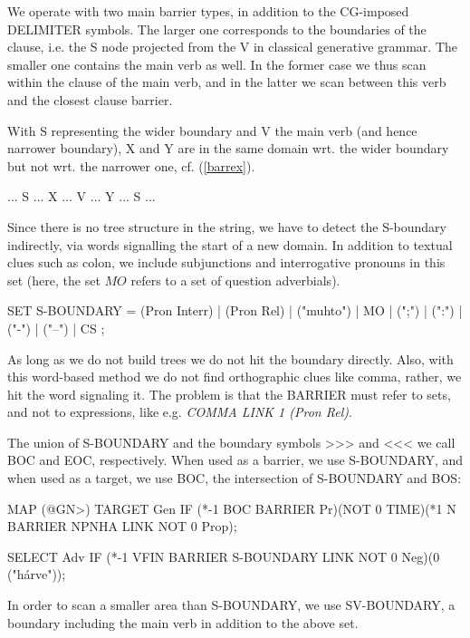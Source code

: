 \documentclass[a4paper,english]{article} %
\begin{document}
We operate with two main barrier types, in addition to the CG-imposed DELIMITER symbols. The larger one corresponds to the boundaries of the clause, i.e. the S node projected from the V in classical generative grammar. The smaller one contains the main verb as well. In the former case we thus scan within the clause of the main verb, and in the latter we scan between this verb and the closest clause barrier.%

With S representing the wider boundary and V the main verb (and hence narrower boundary), X and Y are in the same domain wrt. the wider boundary but not wrt. the narrower one, cf. (\ref{barrex}). %

\begin{example}\label{barrex}
... S ... X ... V ... Y ... S ... 
\end{example}


Since there is no tree structure in the string, we have to detect the S-boundary indirectly, via words signalling the start of a new domain. In addition to textual clues such as colon, we include subjunctions and interrogative pronouns in this set (here, the set $MO$ refers to a set of question adverbials).%

\begin{example}\label{s}
SET S-BOUNDARY  = (Pron Interr) | (Pron Rel) | ("muhto") | MO | (";") | (":") | ("-") | ("–") | CS ;	
\end{example}

As long as we do not build trees we do not hit the boundary directly. Also, with this word-based method we do not find orthographic clues like comma, rather, we hit the word signaling it. The problem is that the BARRIER must refer to sets, and not to expressions, like e.g. \textit{COMMA LINK 1 (Pron Rel)}.%

The union of S-BOUNDARY and the boundary symbols >>> and <<< we call BOC and EOC, respectively. When used as a barrier, we use S-BOUNDARY, and when used as a target, we use BOC, the intersection of S-BOUNDARY and BOS:%

\begin{example}
MAP (@GN>) TARGET Gen IF (*-1 BOC BARRIER Pr)(NOT 0 TIME)(*1 N BARRIER NPNHA LINK NOT 0 Prop);
\end{example}
\begin{example}
SELECT Adv IF (*-1 VFIN BARRIER S-BOUNDARY LINK NOT 0 Neg)(0 ("hárve"));
\end{example}

In order to scan a smaller area than S-BOUNDARY, we use SV-BOUNDARY, a boundary including the main verb in addition to the above set.%
\end{document}
